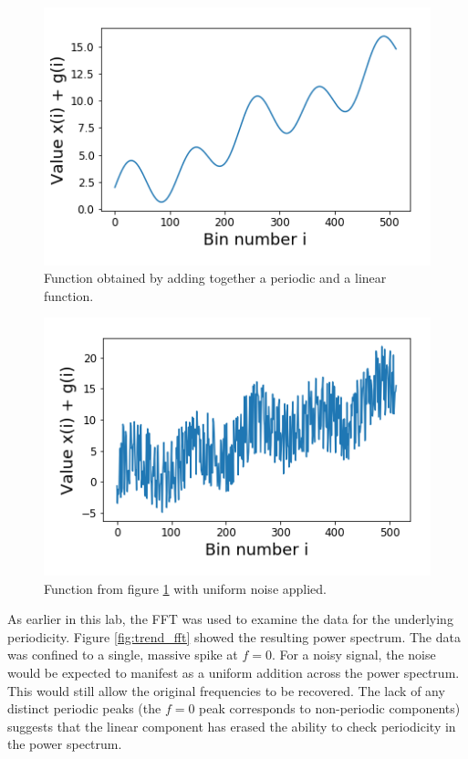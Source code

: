 \documentclass[twocolumn]{article}
\begin{document}
\begin{figure}
\centering
\includegraphics[width=\linewidth]{trend}
\caption{Function obtained by adding together a periodic and a linear function.}
\label{fig:trend}
\end{figure}

\begin{figure}
\centering
\includegraphics[width=\linewidth]{noise_trend}
\caption{Function from figure \ref{fig:trend} with uniform noise applied.}
\label{fig:noise_trend}
\end{figure}

As earlier in this lab, the FFT was used to examine the data for the underlying periodicity. Figure \ref{fig:trend_fft} showed the resulting power spectrum. The data was confined to a single, massive spike at $f=0$. For a noisy signal, the noise would be expected to manifest as a uniform addition across the power spectrum. This would still allow the original frequencies to be recovered. The lack of any distinct periodic peaks (the $f=0$ peak corresponds to non-periodic components) suggests that the linear component has erased the ability to check periodicity in the power spectrum. 
\end{document}

